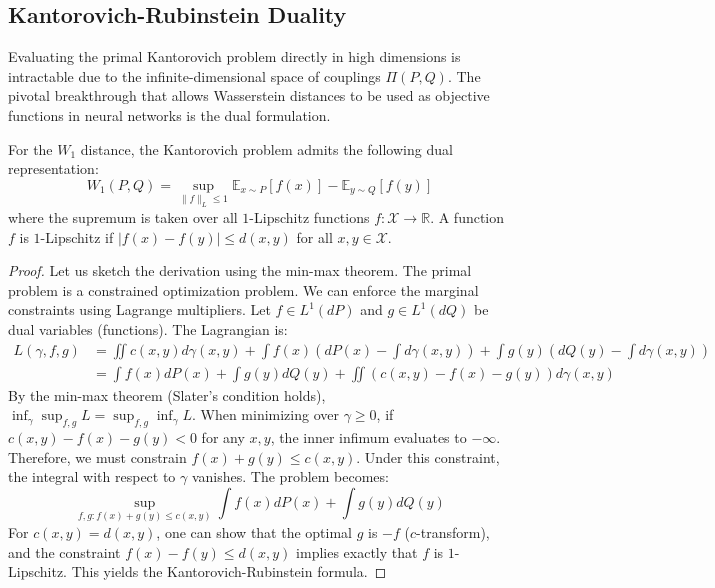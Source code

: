 \subsection{Kantorovich-Rubinstein Duality}
Evaluating the primal Kantorovich problem directly in high dimensions is intractable due to the infinite-dimensional space of couplings $\Pi(P, Q)$. The pivotal breakthrough that allows Wasserstein distances to be used as objective functions in neural networks is the dual formulation.

\begin{theorem}
\label{thm:kr_duality}
For the $W_1$ distance, the Kantorovich problem admits the following dual representation:
\[
W_1(P, Q) = \sup_{\|f\|_L \leq 1} \mathbb{E}_{x \sim P}[f(x)] - \mathbb{E}_{y \sim Q}[f(y)]
\]
where the supremum is taken over all $1$-Lipschitz functions $f: \mathcal{X} \to \mathbb{R}$. A function $f$ is $1$-Lipschitz if $|f(x) - f(y)| \leq d(x, y)$ for all $x, y \in \mathcal{X}$.
\end{theorem}

\begin{proof}
Let us sketch the derivation using the min-max theorem. The primal problem is a constrained optimization problem. We can enforce the marginal constraints using Lagrange multipliers. Let $f \in L^1(dP)$ and $g \in L^1(dQ)$ be dual variables (functions). 
The Lagrangian is:
\begin{align*}
L(\gamma, f, g) &= \iint c(x,y) d\gamma(x,y) + \int f(x) \left( dP(x) - \int d\gamma(x,y) \right) + \int g(y) \left( dQ(y) - \int d\gamma(x,y) \right) \\
&= \int f(x) dP(x) + \int g(y) dQ(y) + \iint \left( c(x,y) - f(x) - g(y) \right) d\gamma(x,y)
\end{align*}
By the min-max theorem (Slater's condition holds), $\inf_\gamma \sup_{f,g} L = \sup_{f,g} \inf_\gamma L$.
When minimizing over $\gamma \geq 0$, if $c(x,y) - f(x) - g(y) < 0$ for any $x,y$, the inner infimum evaluates to $-\infty$. Therefore, we must constrain $f(x) + g(y) \leq c(x,y)$. Under this constraint, the integral with respect to $\gamma$ vanishes. The problem becomes:
\[
\sup_{f,g: f(x)+g(y) \leq c(x,y)} \int f(x) dP(x) + \int g(y) dQ(y)
\]
For $c(x,y) = d(x,y)$, one can show that the optimal $g$ is $-f$ ($c$-transform), and the constraint $f(x) - f(y) \leq d(x,y)$ implies exactly that $f$ is $1$-Lipschitz. This yields the Kantorovich-Rubinstein formula.
\end{proof}

